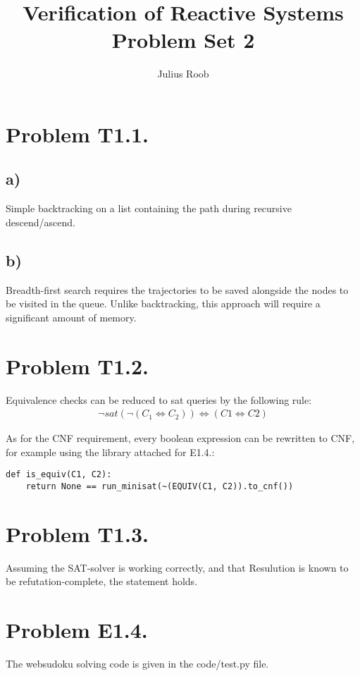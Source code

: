 \documentclass[]{eptcs}
\title{Verification of Reactive Systems\\
       Problem Set 2}
\author{Julius Roob
	\email{julius@juliusroob.de}
}
\begin{document}
	\maketitle \newpage
	\listoftodos \newpage
	
	\newpage
	\section*{Problem T1.1.}
		\subsection*{a)}
			Simple backtracking on a list containing the path during recursive descend/ascend.
		
		\subsection*{b)}
			Breadth-first search requires the trajectories to be saved alongside the nodes to be visited in the queue.
			Unlike backtracking, this approach will require a significant amount of memory.
	
	\newpage
	\section*{Problem T1.2.}
		Equivalence checks can be reduced to sat queries by the following rule:
		\begin{align*}
			\neg sat(\neg (C_{1} \Leftrightarrow C_{2})) \Leftrightarrow (C1 \Leftrightarrow C2)
		\end{align*}
		
		As for the CNF requirement, every boolean expression can be rewritten to CNF, for example using the library attached for E1.4.:
\begin{lstlisting}
def is_equiv(C1, C2):
	return None == run_minisat(~(EQUIV(C1, C2)).to_cnf())
\end{lstlisting}
	
	
	\newpage
	\section*{Problem T1.3.}
		Assuming the SAT-solver is working correctly, and that Resulution is known to be refutation-complete, the statement holds.
	
	\newpage
	\section*{Problem E1.4.}
		The websudoku solving code is given in the code/test.py file.
		
\end{document}
